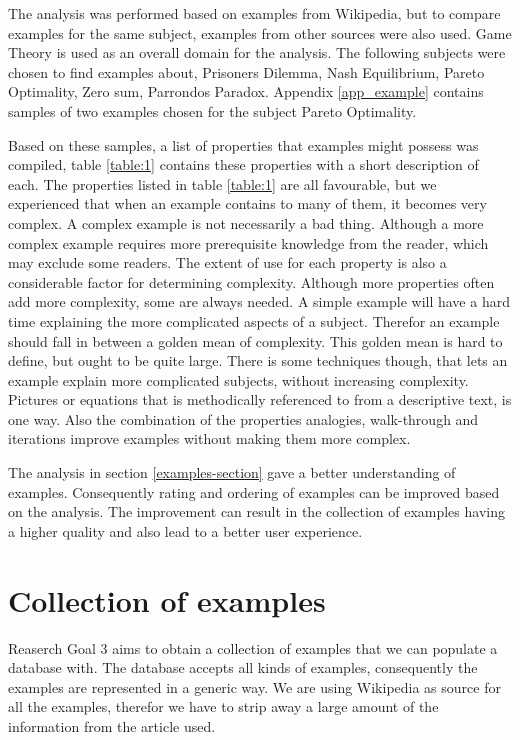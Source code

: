 The analysis was performed based on examples from Wikipedia, but to compare examples for the same subject, examples from other sources were also used. Game Theory is used as an overall domain for the analysis. The following subjects were chosen to find examples about, Prisoners Dilemma, Nash Equilibrium, Pareto Optimality, Zero sum, Parrondos Paradox. Appendix \ref{app_example} contains samples of two examples chosen for the subject Pareto Optimality. 

Based on these samples, a list of properties that examples might possess was compiled, table \ref{table:1} contains these properties with a short description of each. The properties listed in table \ref{table:1} are all favourable, but we experienced that when an example contains to many of them, it becomes very complex. A complex example is not necessarily a bad thing. Although a more complex example requires more prerequisite knowledge from the reader, which may exclude some readers. The extent of use for each property is also a considerable factor for determining complexity. Although more properties often add more complexity, some are always needed. A simple example will have a hard time explaining the more complicated aspects of a subject. Therefor an example should fall in between a golden mean of complexity. This golden mean is hard to define, but ought to be quite large. There is some techniques though, that lets an example explain more complicated subjects, without increasing complexity. Pictures or equations that is methodically referenced to from a descriptive text, is one way. Also the combination of the properties analogies, walk-through and iterations improve examples without making them more complex. 

The analysis in section \ref{examples-section} gave a better understanding of examples. Consequently rating and ordering of examples can be improved based on the analysis. 
The improvement can result in the collection of examples having a higher quality and also lead to a better user experience. 


\section{Collection of examples}
Reaserch Goal 3 aims to obtain a collection of examples that we can populate a database with. The database accepts all kinds of examples, consequently the examples are represented in a generic way. We are using Wikipedia as source for all the examples, therefor we have to strip away a large amount of the information from the article used. 

